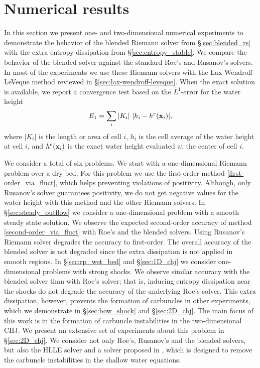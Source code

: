 \documentclass[preprint, 11pt]{article}
\newcommand{\bfx}{{\bf x}}
\begin{document}
\section{Numerical results}\label{sec:num}
In this section we present one- and two-dimensional numerical experiments to demonstrate the behavior of the
blended Riemann solver from \S\ref{sec:blended_rs} with the extra entropy dissipation from \S\ref{sec:entropy_stable}.
We compare the behavior of the blended solver against the standard Roe's and Rusanov's solvers.
In most of the experiments we use these Riemann solvers with the Lax-Wendroff-LeVeque method reviewed in \S\ref{sec:lax-wendroff-leveque}.
When the exact solution is available, we report a convergence test based on the $L^1$-error for the water height
\begin{align*}
  E_1=\sum_i|K_i|~|h_i-h^e(\bfx_i)|,
\end{align*}
where $|K_i|$ is the length or area of cell $i$,
$h_i$ is the cell average of the water height at cell $i$,
and $h^e(\bfx_i)$ is the exact water height evaluated at the center of cell $i$.

We consider a total of six problems. We start with a one-dimensional Riemann problem over a dry bed.
For this problem we use the first-order method \eqref{first-order_via_fluct},
which helps preventing violations of positivity. Although, only Rusanov's solver guarantees
positivity, we do not get negative values for the water height with this method and the other Riemann solvers.
In \S \ref{sec:steady_outflow} we consider a one-dimensional problem with a smooth steady state solution. We observe the expected
second-order accuracy of method \eqref{second-order_via_fluct} with Roe's and the blended solvers. Using
Rusanov's Riemann solver degrades the accuracy to first-order. The overall accuracy of the blended solver
is not degraded since the extra dissipation is not applied in smooth regions.
In \S\ref{sec:rp_wet_bed} and \S\ref{sec:1D_chj} we consider one-dimensional problems with strong shocks. We observe similar accuracy with the
blended solver than with Roe's solver; that is, inducing entropy dissipation near the shocks do not degrade the accuracy
of the underlying Roe's solver. This extra dissipation, however, prevents the formation of carbuncles in other experiments,
which we demonstrate in \S \ref{sec:bow_shock} and \S\ref{sec:2D_chj}.
The main focus of this work is in the formation of carbuncle instabilities in the two-dimensional CHJ. We present
an extensive set of experiments about this problem in \S \ref{sec:2D_chj}.
We consider not only Roe's, Rusanov's and the blended solvers, but also the HLLE solver and a solver proposed in \cite{kemm2014note},
which is designed to remove the carbuncle instabilities in the shallow water equations.
\end{document}
